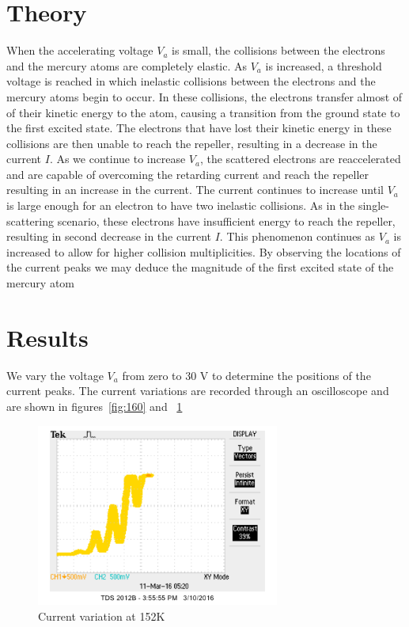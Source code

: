 \documentclass[aps, reprint,amsmath,amssymb]{revtex4-1} %
\begin{document}
\section{Theory}

When the accelerating voltage $V_a$ is small, the collisions between the electrons and the mercury atoms are completely elastic. As $V_a$ is increased, a threshold voltage is reached in which inelastic collisions between the electrons and the mercury atoms begin to occur. In these collisions, the electrons transfer almost of of their kinetic energy to the atom, causing a transition from the ground state to the first excited state. The electrons that have lost their kinetic energy in these collisions are then unable to reach the repeller, resulting in a decrease in the current $I$. As we continue to increase $V_a$, the scattered electrons are reaccelerated and are capable of overcoming the retarding current and reach the repeller resulting in an increase in the current. The current continues to increase until $V_a$ is large enough for an electron to have two inelastic collisions. As in the single-scattering scenario, these electrons have insufficient energy to reach the repeller, resulting in second decrease in the current $I$. This phenomenon continues as $V_a$ is increased to allow for higher collision multiplicities. By observing the locations of the current peaks we may deduce the magnitude of the first excited state of the mercury atom

\section{Results}

We vary the voltage $V_a$ from zero to 30 V to determine the positions of the current peaks. The current variations are recorded through an oscilloscope and are shown in figures~\ref{fig:160} and ~\ref{fig:152}
\begin{figure}
\centering
\includegraphics[width=8cm]{jb_mp_152.png}
\caption{Current variation at 152K}
\label{fig:152}
\end{figure}
\end{document}
